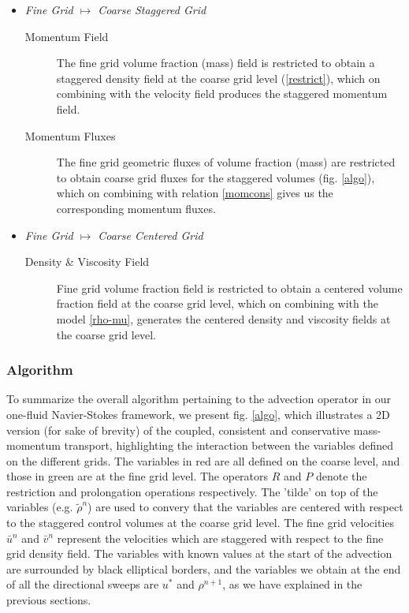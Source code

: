 \begin{itemize}
	\item \textit{Fine Grid $\longmapsto$ Coarse Staggered Grid}
          
	  \begin{description}
		  \item[Momentum Field] The fine grid volume fraction (mass) field
			  is restricted to obtain a staggered density field at the 
			  coarse grid level (\ref{restrict}), which on combining with 
			  the velocity field produces the staggered momentum field.    
		\item[Momentum Fluxes] The fine grid geometric fluxes of volume fraction 
			(mass) are restricted to obtain coarse grid fluxes for the 
			  staggered volumes (fig. \ref{algo}), which on combining with 
			  relation \ref{momcons} gives us the corresponding momentum fluxes.   
	  \end{description}

  \item \textit{Fine Grid $\longmapsto$ Coarse Centered Grid}

          \begin{description}
		  \item[Density \& Viscosity Field] Fine grid volume fraction field is 
			  restricted to obtain a centered volume fraction field at the 
			  coarse grid level, which on combining with the model \ref{rho-mu}, 
			  generates the centered density and viscosity fields at the coarse grid level.   
	  \end{description}

\end{itemize}



\subsubsection*{Algorithm}

To summarize the overall algorithm pertaining to the advection 
operator in our one-fluid Navier-Stokes framework, 
we present fig. \ref{algo}, which illustrates a 2D version 
(for sake of brevity) of the coupled, consistent and conservative 
mass-momentum transport, highlighting the interaction between the 
variables defined on the different grids. 
The variables in red are all defined on the coarse level, 
and those in green are at the fine grid level. 
The operators $R$ and $P$ denote the restriction and prolongation operations respectively.
The 'tilde' on top of the variables (e.g. $\tilde{\rho}^{n} $) are 
used to convery that the variables are centered with respect to the 
staggered control volumes at the coarse grid level. 
The fine grid velocities $\bar{u}^{n}$ and $\bar{v}^{n}$ represent the 
velocities which are staggered with respect to the fine grid density field. 
The variables with known values at the start of the advection are 
surrounded by black elliptical borders, and the variables we obtain at the 
end of all the directional sweeps are $u^{*}$ and $\rho^{n+1}$, 
as we have explained in the previous sections. 


